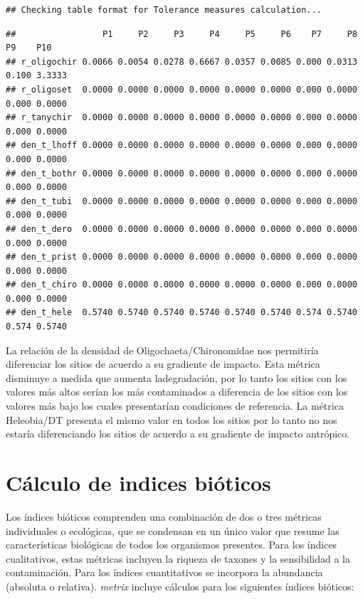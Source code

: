 \documentclass[
]{book}
\begin{document}
\begin{verbatim}
## Checking table format for Tolerance measures calculation...
\end{verbatim}

\begin{verbatim}
##                 P1     P2     P3     P4     P5     P6    P7     P8    P9    P10
## r_oligochir 0.0066 0.0054 0.0278 0.6667 0.0357 0.0085 0.000 0.0313 0.100 3.3333
## r_oligoset  0.0000 0.0000 0.0000 0.0000 0.0000 0.0000 0.000 0.0000 0.000 0.0000
## r_tanychir  0.0000 0.0000 0.0000 0.0000 0.0000 0.0000 0.000 0.0000 0.000 0.0000
## den_t_lhoff 0.0000 0.0000 0.0000 0.0000 0.0000 0.0000 0.000 0.0000 0.000 0.0000
## den_t_bothr 0.0000 0.0000 0.0000 0.0000 0.0000 0.0000 0.000 0.0000 0.000 0.0000
## den_t_tubi  0.0000 0.0000 0.0000 0.0000 0.0000 0.0000 0.000 0.0000 0.000 0.0000
## den_t_dero  0.0000 0.0000 0.0000 0.0000 0.0000 0.0000 0.000 0.0000 0.000 0.0000
## den_t_prist 0.0000 0.0000 0.0000 0.0000 0.0000 0.0000 0.000 0.0000 0.000 0.0000
## den_t_chiro 0.0000 0.0000 0.0000 0.0000 0.0000 0.0000 0.000 0.0000 0.000 0.0000
## den_t_hele  0.5740 0.5740 0.5740 0.5740 0.5740 0.5740 0.574 0.5740 0.574 0.5740
\end{verbatim}

La relación de la densidad de Oligochaeta/Chironomidae nos permitiría diferenciar los sitios de acuerdo a su gradiente de impacto.
Esta métrica disminuye a medida que aumenta ladegradación, por lo tanto los sitios con los valores más altos serían los más contaminados a diferencia de los sitios con los valores más bajo los cuales presentarían condiciones de referencia.
La métrica Heleobia/DT presenta el mismo valor en todos los sitios por lo tanto no nos estaría diferenciando los sitios de acuerdo a su gradiente de impacto antrópico.

\hypertarget{cuxe1lculo-de-indices-biuxf3ticos}{%
\section{Cálculo de indices bióticos}\label{cuxe1lculo-de-indices-biuxf3ticos}}

Los índices bióticos comprenden una combinación de dos o tres métricas individuales o ecológicas, que se condensan en un único valor que resume las características biológicas de todos los organismos presentes.
Para los índices cualitativos, estas métricas incluyen la riqueza de taxones y la sensibilidad a la contaminación.
Para los índices cuantitativos se incorpora la abundancia (absoluta o relativa).
\emph{metrix} incluye cálculos para los siguientes índices bióticos:
\end{document}
